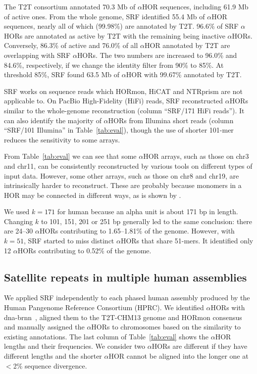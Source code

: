\documentclass{bioinfo}
\newcommand{\revised}[1]{{\color{blue}#1}}
\begin{document}
\revised{The T2T consortium annotated 70.3 Mb of $\alpha$HOR sequences,
including 61.9 Mb of active ones. From the whole genome, SRF identified
55.4 Mb of $\alpha$HOR sequences, nearly all of which (99.98\%) are annotated
by T2T. 96.6\% of SRF $\alpha$HORs are annotated as active by T2T
with the remaining being inactive $\alpha$HORs. Conversely, 86.3\% of active
and 76.0\% of all $\alpha$HOR annotated by T2T are overlapping with SRF
$\alpha$HORs. The two numbers are increased to 96.0\% and 84.6\%, respectively,
if we change the identity filter from 90\% to 85\%. At threshold 85\%, SRF
found 63.5 Mb of $\alpha$HOR with 99.67\% annotated by T2T.}

SRF works on sequence reads which HORmon, HiCAT and NTRprism are not
applicable to. On PacBio High-Fidelity (HiFi) reads, SRF reconstructed
$\alpha$HORs similar to the whole-genome reconstruction (column ``SRF/171 HiFi
reads''). It can also identify the majority of $\alpha$HORs from Illumina short
reads (column ``SRF/101 Illumina'' in Table~\ref{tab:eval}), though the use of
shorter 101-mer reduces the sensitivity to some arrays.

From Table~\ref{tab:eval} we can see that some $\alpha$HOR arrays, such as
those on chr3 and chr11, can be consistently reconstructed by various tools on
different types of input data. However, some other arrays, such as those on
chr8 and chr19, are intrinsically harder to reconstruct. These are probably
because monomers in a HOR may be connected in different ways, as is shown by
\citet{Kunyavskaya:2022tx}.

\revised{We used $k=171$ for human because an alpha unit is about 171 bp in
length.  Changing $k$ to 101, 151, 201 or 251 bp generally led to the same
conclusion: there are 24--30 $\alpha$HORs contributing to 1.65--1.81\% of
the genome. However, with $k=51$, SRF started to miss distinct $\alpha$HORs
that share 51-mers. It identified only 12 $\alpha$HORs contributing to 0.52\%
of the genome.}

\subsection{Satellite repeats in multiple human assemblies}

We applied SRF independently to each phased human assembly produced by the
Human Pangenome Reference Consortium (HPRC). We identified $\alpha$HORs
with dna-brnn~\citep{Li:2019aa}, aligned them to the T2T-CHM13 genome and
HORmon consensus and manually assigned the $\alpha$HORs to chromosomes based on
the similarity to existing annotations. The last column of Table~\ref{tab:eval}
shows the $\alpha$HOR lengths and their frequencies. We consider two
$\alpha$HORs are different if they have different lengths and the shorter
$\alpha$HOR cannot be aligned into the longer one at $<$2\% sequence
divergence.
\end{document}

